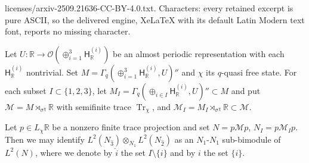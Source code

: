 \documentclass[10pt,a4paper]{amsart}
\newcommand{\R}{{\mathbb R}}
\newcommand{\Tr}{\operatorname{Tr}}
\newcommand{\cM}{{\mathcal M}}
\newcommand{\cO}{{\mathcal O}}
\newcommand{\ot}{\otimes}
\newcommand{\sH}{\mathsf{H}}
\begin{document}
licenses/arxiv-2509.21636-CC-BY-4.0.txt. Characters: every retained excerpt is pure ASCII, so the delivered engine, XeLaTeX with its default Latin Modern text font, reports no missing character.
\begin{lem}\label{lem: embedding bimodules}
Let $U:\R\to \cO(\oplus_{i=1}^3 \sH_\R^{(i)})$ be an almost periodic representation with each $\sH_\R^{(i)}$ nontrivial.
Set $M=\Gamma_q(\oplus_{i=1}^3\sH_\R^{(i)}, U)''$ and $\chi$ its $q$-quasi free state.
For each subset $I\subset \{1,2,3\}$, let $M_I=\Gamma_q(\oplus_{i\in I} \sH_\R^{(i)}, U)''\subset M$
	and put $\cM=M\rtimes_{\sigma^\chi}\R$ with semifinite trace $\Tr_\chi$,
		and $\cM_I=M_I\rtimes_{\sigma^\chi}\R\subset \cM$.


Let $p\in L_\chi\R$ be a nonzero finite trace projection and set $N=p\cM p$, $N_I=p\cM_I p$.
Then we may identify $L^2(N_{\hat 3 })\ot_{ N_{1} } L^2(N_{\hat 2})$ as an $N_1$-$N_1$ sub-bimodule of $L^2(N)$,
	where we denote by $\hat i$ the set $I\setminus \{i\}$ and by $i$ the set $\{i\}$.
\end{lem}
\end{document}

